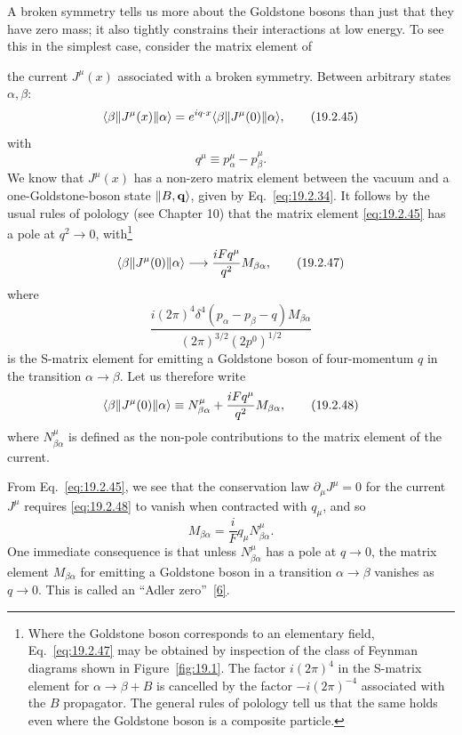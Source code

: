 A broken symmetry tells us more about the Goldstone bosons than just that
they have zero mass; it also tightly constrains their interactions at low
energy. To see this in the simplest case, consider the matrix element of



the current $J^\mu(x)$ associated with a broken symmetry. Between arbitrary
states $\alpha,\beta$:
\begin{equation}
 \langle \beta\rVert J^\mu(x)\lVert \alpha\rangle
 =e^{iq\cdot x}\langle \beta\rVert J^\mu(0)\lVert \alpha\rangle,
 \tag{19.2.45}\label{eq:19.2.45}
\end{equation}
with
\begin{equation}
 q^\mu\equiv p_\alpha^\mu-p_\beta^\mu.
 \tag{19.2.46}\label{eq:19.2.46}
\end{equation}
We know that $J^\mu(x)$ has a non-zero matrix element between the vacuum and
a one-Goldstone-boson state $\lVert B,\mathbf q\rangle$, given by
Eq.~\eqref{eq:19.2.34}. It follows by the usual rules of polology (see
Chapter 10) that the matrix element \eqref{eq:19.2.45} has a pole at
$q^2\to0$, with\footnote{Where the Goldstone boson corresponds to an
elementary field, Eq.~\eqref{eq:19.2.47} may be obtained by inspection of
the class of Feynman diagrams shown in Figure~\ref{fig:19.1}. The factor
$i(2\pi)^4$ in the S-matrix element for $\alpha\to\beta+B$ is cancelled by
the factor $-i(2\pi)^{-4}$ associated with the $B$ propagator. The general
rules of polology tell us that the same holds even where the Goldstone boson
is a composite particle.}
\begin{equation}
 \langle \beta\rVert J^\mu(0)\lVert \alpha\rangle
 \longrightarrow \frac{iFq^\mu}{q^2}M_{\beta\alpha},
 \tag{19.2.47}\label{eq:19.2.47}
\end{equation}
where
\[
 \frac{i(2\pi)^4\delta^4(p_\alpha-p_\beta-q)M_{\beta\alpha}}
 {(2\pi)^{3/2}(2p^0)^{1/2}}
\]
is the S-matrix element for emitting a Goldstone boson of four-momentum $q$
in the transition $\alpha\to\beta$. Let us therefore write
\begin{equation}
 \langle \beta\rVert J^\mu(0)\lVert \alpha\rangle
 \equiv N^\mu_{\beta\alpha}
 +\frac{iFq^\mu}{q^2}M_{\beta\alpha},
 \tag{19.2.48}\label{eq:19.2.48}
\end{equation}
where $N^\mu_{\beta\alpha}$ is defined as the non-pole contributions to the
matrix element of the current.



From Eq.~\eqref{eq:19.2.45}, we see that the conservation law
$\partial_\mu J^\mu=0$ for the current $J^\mu$ requires
\eqref{eq:19.2.48} to vanish when contracted with $q_\mu$, and so
\begin{equation}
 M_{\beta\alpha}=\frac{i}{F}q_\mu N^\mu_{\beta\alpha}.
 \tag{19.2.49}\label{eq:19.2.49}
\end{equation}
One immediate consequence is that unless $N^\mu_{\beta\alpha}$ has a pole at
$q\to0$, the matrix element $M_{\beta\alpha}$ for emitting a Goldstone boson
in a transition $\alpha\to\beta$ vanishes as $q\to0$. This is called an
``Adler zero''~\hyperref[ch19-ref-6]{[6]}.

